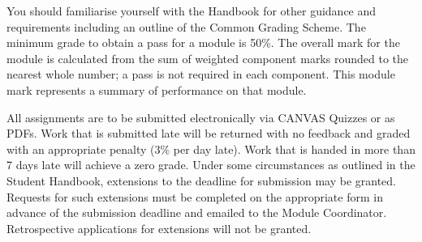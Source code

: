 \documentclass[
]{book}
\begin{document}
You should familiarise yourself with the Handbook for other guidance and requirements including an outline of the Common Grading Scheme. The minimum grade to obtain a pass for a module is 50\%. The overall mark for the module is calculated from the sum of weighted component marks rounded to the nearest whole number; a pass is not required in each component. This module mark represents a summary of performance on that module.

All assignments are to be submitted electronically via CANVAS Quizzes or as PDFs. Work that is submitted late will be returned with no feedback and graded with an appropriate penalty (3\% per day late). Work that is handed in more than 7 days late will achieve a zero grade. Under some circumstances as outlined in the Student Handbook, extensions to the deadline for submission may be granted. Requests for such extensions must be completed on the appropriate form in advance of the submission deadline and emailed to the Module Coordinator. Retrospective applications for
extensions will not be granted.

\backmatter
  
\end{document}

